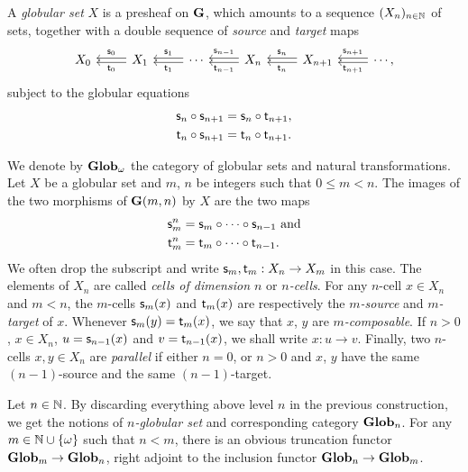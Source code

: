 \begin{definition}\label{def:globular_set}
  A {\em globular set} $X$ is a presheaf on $\mathbf{G}$, which amounts to a sequence
$(X_n)_{n\in\mathbb N}$ of sets, together with a double sequence of {\em source} and {\em target} maps
\[
  \begin{tikzcd}
   X_0 & X_1 \tdouble{l}{"\sce{0}"'}{"\tge{0}"}& \tdouble{l}{"\sce{1}"'}{"\tge{1}"}\cdots & X_n \tdouble{l}{"\sce{n-1}"'}{"\tge{n-1}"}& \tdouble{l}{"\sce{n}"'}{"\tge{n}"} X_{n+1}& \cdots \tdouble{l}{"\sce{n+1}"'}{"\tge{n+1}"},
  \end{tikzcd}
  \]
subject to the globular equations
\begin{align*}
  \mathsf{s}_{n}\circ\mathsf{s}_{n+1} & = \mathsf{s}_{n}\circ\mathsf{t}_{n+1},\\
  \mathsf{t}_{n}\circ\mathsf{s}_{n+1}& = \mathsf{t}_{n}\circ\mathsf{t}_{n+1}.
\end{align*}
\end{definition}
\begin{paragr}
  We denote by $\mathbf{Glob}_{\omega}$ the category of globular sets and natural
  transformations. Let $X$ be a globular set and  $m$, $n$ be integers
  such that $0\leq m<n$. The images of the two morphisms of
  $\mathbf{G}(m,n)$ by $X$ are the two maps 
\begin{align*}
  \mathsf{s}_{m}^n & = \mathsf{s}_{m}\circ\cdots\circ \mathsf{s}_{n-1}\ \text{and}\\
   \mathsf{t}_{m}^n & = \mathsf{t}_{m}\circ\cdots\circ \mathsf{t}_{n-1}.
\end{align*}
We often drop the subscript and write $\mathsf{s}_{m},\mathsf{t}_{m}:X_n\to X_m$ in this case. The elements of $X_n$ are called {\em cells of dimension $n$}  or {\em $n$-cells}. For any $n$-cell $x\in X_n$ and $m<n$, the $m$-cells $\mathsf{s}_{m}(x)$ and $\mathsf{t}_{m}(x)$ are respectively the {\em $m$-source} and {\em $m$-target} of $x$. Whenever $\mathsf{s}_{m}(y)=\mathsf{t}_{m}(x)$, we say that $x$, $y$ are {\em $m$-composable}.
If $n>0$, $x\in X_n$, $u=\mathsf{s}_{n-1}(x)$ and $v=\mathsf{t}_{n-1}(x)$, we shall write $x:u\to v$.
Finally, two $n$-cells $x,y\in X_n$ are {\em parallel} if either $n=0$, or $n>0$ and $x$, $y$ have the same $(n{-}1)$-source and the same $(n{-}1)$-target.

\end{paragr}

\begin{paragr}
  Let $n\in \mathbb N$. By discarding everything above level $n$ in the previous construction, we get the notions of {\em $n$-globular set} and corresponding category $\mathbf{Glob}_{n}$. For any $m\in\mathbb N\cup\left\{\omega\right\}$ such that $n<m$, there is an obvious truncation functor $\mathbf{Glob}_{m}\to \mathbf{Glob}_{n}$, right adjoint to the inclusion functor $\mathbf{Glob}_{n}\to \mathbf{Glob}_{m}$.
\end{paragr}



